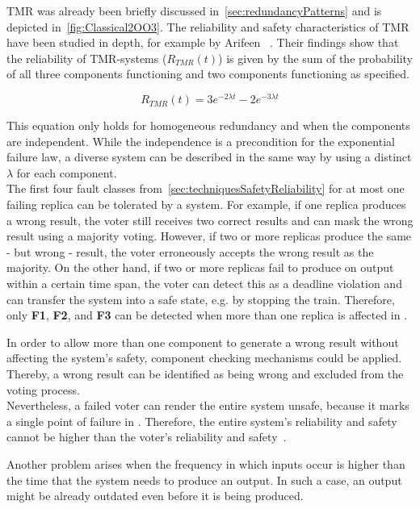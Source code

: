 \Gls*{TMR} was already been briefly discussed in~\autoref{sec:redundancyPatterns} and is depicted in~\autoref{fig:Classical2OO3}.
The reliability and safety characteristics of \gls*{TMR} have been studied in depth, for example by Arifeen \etal~\cite{ArifeenFaultTolerantTMR}.
Their findings show that the reliability of \gls*{TMR}-systems ($R_{TMR}(t)$) is given by the sum of the probability of all three components functioning and two components functioning as specified.

\begin{equation}
R_{TMR}(t) = 3e^{-2 \lambda t} - 2e^{-3 \lambda t}
\end{equation}

This equation only holds for homogeneous redundancy and when the components are independent.
While the independence is a precondition for the exponential failure law, a diverse system can be described in the same way by using a distinct $\lambda$ for each component.
\\

The first four fault classes from~\autoref{sec:techniquesSafetyReliability} for at most one failing replica can be tolerated by a  system.
For example, if one replica produces a wrong result, the voter still receives two correct results and can mask the wrong result using a majority voting.
However, if two or more replicas produce the same - but wrong - result, the voter erroneously accepts the wrong result as the majority.
On the other hand, if two or more replicas fail to produce on output within a certain time span, the voter can detect this as a deadline violation and can transfer the system into a safe state, e.g. by stopping the train.
Therefore, only \textbf{F1}, \textbf{F2}, and \textbf{F3} can be detected when more than one replica is affected in .

In order to allow more than one component to generate a wrong result without affecting the system's safety, component checking mechanisms could be applied.
Thereby, a wrong result can be identified as being wrong and excluded from the voting process.
\\

Nevertheless, a failed voter can render the entire system unsafe, because it marks a single point of failure in .
Therefore, the entire system's reliability and safety cannot be higher than the voter's reliability and safety~\cite{ArifeenFaultTolerantTMR}.

Another problem arises when the frequency in which inputs occur is higher than the time that the system needs to produce an output.
In such a case, an output might be already outdated even before it is being produced.
\\

